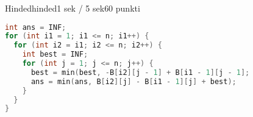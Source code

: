 \begin{yl}{5}{Hinded}{hinded}{1 sek / 5 sek}{60 punkti}
  \clearpage
\begin{lstlisting}[language=C++]
int ans = INF;
for (int i1 = 1; i1 <= n; i1++) {
  for (int i2 = i1; i2 <= n; i2++) {
    int best = INF;
    for (int j = 1; j <= n; j++) {
      best = min(best, -B[i2][j - 1] + B[i1 - 1][j - 1];
      ans = min(ans, B[i2][j] - B[i1 - 1][j] + best);
    }
  }
}
\end{lstlisting}
\end{yl}
